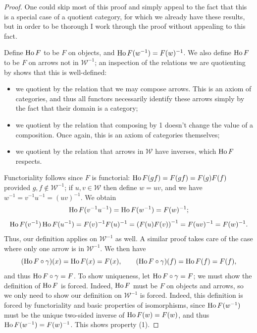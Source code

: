 \begin{proof}
	One could skip most of this proof and simply appeal to the fact that this is a special case of a quotient category, for which we already have these results, but in order to be thorough I work through the proof without appealing to this fact.

	Define $\operatorname{Ho} F$ to be $F$ on objects, and $\operatorname{Ho} F(w^{-1} )=F(w)^{-1} $. We also define $\operatorname{Ho} F$ to be $F$ on arrows not in $\mathcal{W} ^{-1} $; an inspection of the relations we are quotienting by shows that this is well-defined:
	\begin{itemize}
		\item we quotient by the relation that we may compose arrows. This is an axiom of categories, and thus all functors necessarily identify these arrows simply by the fact that their domain is a category;
		\item we quotient by the relation that composing by 1 doesn't change the value of a composition. Once again, this is an axiom of categories themselves;
		\item we quotient by the relation that arrows in $\mathcal{W} $ have inverses, which $\operatorname{Ho} F$ respects.
	\end{itemize}
	Functoriality follows since $F$ is functorial: $\operatorname{Ho} F(gf)=F(gf)=F(g)F(f)$ provided $g,f\notin \mathcal{W} ^{-1} $; if $u,v\in \mathcal{W} $ then define $w=uv$, and we have $w^{-1} =v^{-1} u^{-1} =(uv)^{-1} $. We obtain
	\[
		\operatorname{Ho} F(v^{-1} u^{-1} )=\operatorname{Ho} F(w^{-1} )=F(w)^{-1} ;
	\]
	\[
		\operatorname{Ho} F(v^{-1} )\operatorname{Ho} F(u^{-1} )=F(v)^{-1} F(u)^{-1} =\left( F(u)F(v) \right) ^{-1} =F(uv)^{-1} =F(w)^{-1} 
	.\]
	Thus, our definition applies on $\mathcal{W} ^{-1} $ as well. A similar proof takes care of the case where only one arrow is in $\mathcal{W} ^{-1} $. We then have
	\[
		(\operatorname{Ho} F\circ \gamma)(x)=\operatorname{Ho} F(x)=F(x),\qquad (\operatorname{Ho} F\circ \gamma)(f)=\operatorname{Ho} F(f)=F(f),
	\]
	and thus $\operatorname{Ho} F\circ \gamma=F$. To show uniqueness, let $\operatorname{Ho} F\circ \gamma=F$; we must show the definition of $\operatorname{Ho} F$ is forced. Indeed, $\operatorname{Ho} F$ must be $F$ on objects and arrows, so we only need to show our definition on $\mathcal{W} ^{-1} $ is forced. Indeed, this definition is forced by functoriality and basic properties of isomorphisms, since $\operatorname{Ho} F(w^{-1} )$ must be the unique two-sided inverse of $\operatorname{Ho} F(w)=F(w)$, and thus $\operatorname{Ho} F(w^{-1} )=F(w)^{-1} $. This shows property (1).


\end{proof}
